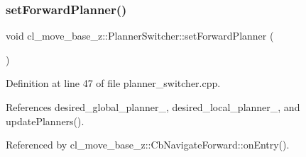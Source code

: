 \subsubsection{\texorpdfstring{set\+Forward\+Planner()}{setForwardPlanner()}}
{\footnotesize\ttfamily void cl\+\_\+move\+\_\+base\+\_\+z\+::\+Planner\+Switcher\+::set\+Forward\+Planner (\begin{DoxyParamCaption}{ }\end{DoxyParamCaption})}



Definition at line 47 of file planner\+\_\+switcher.\+cpp.



References desired\+\_\+global\+\_\+planner\+\_\+, desired\+\_\+local\+\_\+planner\+\_\+, and update\+Planners().



Referenced by cl\+\_\+move\+\_\+base\+\_\+z\+::\+Cb\+Navigate\+Forward\+::on\+Entry().


